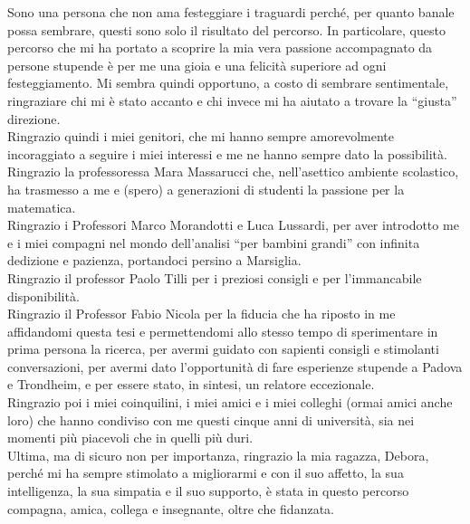 \documentclass[corpo=11pt, stile=classica, tipotesi=custom,
greek, evenboxes, english]{toptesi} %
\numberwithin{equation}{chapter}
\theoremstyle{definition}
\theoremstyle{remark}
\begin{document}
	


\ringraziamenti
Sono una persona che non ama festeggiare i traguardi perché, per quanto banale possa sembrare, questi sono solo il risultato del percorso. In particolare, questo percorso che mi ha portato a scoprire la mia vera passione accompagnato da persone stupende è per me una gioia e una felicità superiore ad ogni festeggiamento.
Mi sembra quindi opportuno, a costo di sembrare sentimentale, ringraziare chi mi è stato accanto e chi invece mi ha aiutato a trovare la ``giusta'' direzione.\\
Ringrazio quindi i miei genitori, che mi hanno sempre amorevolmente incoraggiato a seguire i miei interessi e me ne hanno sempre dato la possibilità.\\
Ringrazio la professoressa Mara Massarucci che, nell'asettico ambiente scolastico, ha trasmesso a me e (spero) a generazioni di studenti la passione per la matematica.\\
Ringrazio i Professori Marco Morandotti e Luca Lussardi, per aver introdotto me e i miei compagni nel mondo dell'analisi ``per bambini grandi'' con infinita dedizione e pazienza, portandoci persino a Marsiglia.\\
Ringrazio il professor Paolo Tilli  per i preziosi consigli e per l'immancabile disponibilità.\\
Ringrazio il Professor Fabio Nicola per la fiducia che ha riposto in me affidandomi questa tesi e permettendomi allo stesso tempo di sperimentare in prima persona la ricerca, per avermi guidato con sapienti consigli e stimolanti conversazioni, per avermi dato l'opportunità di fare esperienze stupende a Padova e Trondheim, e per essere stato, in sintesi, un relatore eccezionale.\\
Ringrazio poi i miei coinquilini, i miei amici e i miei colleghi (ormai amici anche loro) che hanno condiviso con me questi cinque anni di università, sia nei momenti più piacevoli che in quelli più duri.\\
Ultima, ma di sicuro non per importanza, ringrazio la mia ragazza, Debora, perché mi ha sempre stimolato a migliorarmi e con il suo affetto, la sua intelligenza, la sua simpatia e il suo supporto, è stata in questo percorso compagna, amica, collega e insegnante, oltre che fidanzata.
\end{document}
